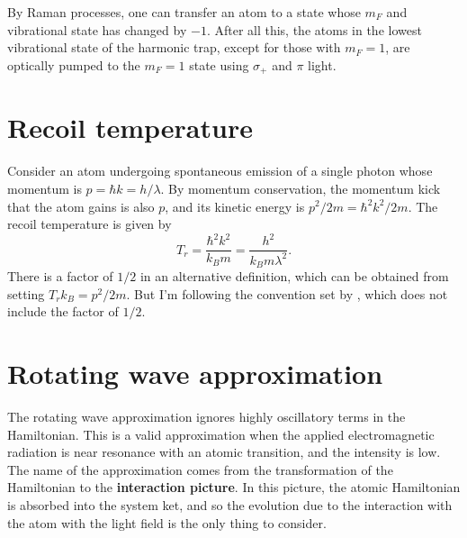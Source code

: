 \documentclass{book}
\theoremstyle{definition}
\newcommand{\f}[2]{\frac{#1}{#2}}
\begin{document}
By Raman processes, one can transfer an atom to a state whose $m_F$ and vibrational state has changed by $-1$. After all this, the atoms in the lowest vibrational state of the harmonic trap, except for those with $m_F = 1$, are optically pumped to the $m_F = 1$ state using $\sigma_+$ and $\pi$ light. 






\section*{Recoil temperature}

Consider an atom undergoing spontaneous emission of a single photon whose momentum is $p = \hbar k = h/\lambda$. By momentum conservation, the momentum kick that the atom gains is also $p$, and its kinetic energy is $p^2/2m = \hbar^2k^2/2m$. The recoil temperature is given by 
\begin{equation*}
T_r = \f{\hbar^2k^2}{k_Bm} = \f{h^2}{k_B m \lambda^2}.
\end{equation*} 
There is a factor of $1/2$ in an alternative definition, which can be obtained from setting $T_r k_B = p^2/2m$. But I'm following the convention set by \cite{metcalf2007laser}, which does not include the factor of $1/2$.






\section*{Rotating wave approximation}


The rotating wave approximation ignores highly oscillatory terms in the Hamiltonian. This is a valid approximation when the applied electromagnetic radiation is near resonance with an atomic transition, and the intensity is low. The name of the approximation comes from the transformation of the Hamiltonian to the \textbf{interaction picture}. In this picture, the atomic Hamiltonian is absorbed into the system ket, and so the evolution due to the interaction with the atom with the light field is the only thing to consider. \\
\end{document}
